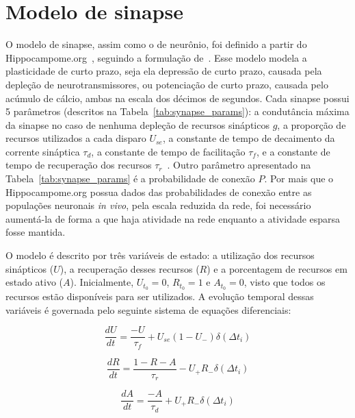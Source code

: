 

\section{Modelo de sinapse}

O modelo de sinapse, assim como o de neurônio, foi definido a partir do Hippocampome.org~\cite{wheelerHippocampomeorg2023},
seguindo a formulação de~\cite{mongilloSynaptic2008a}. Esse modelo modela a plasticidade de curto prazo,
seja ela depressão de curto prazo, causada pela depleção de neurotransmissores, ou potenciação de curto prazo, causada pelo
acúmulo de cálcio, ambas na escala dos décimos de segundos. Cada sinapse possui 5 parâmetros (descritos na
Tabela~\ref{tab:synapse_params}): a condutância máxima da sinapse no caso de nenhuma depleção de recursos sinápticos $g$, a
proporção de recursos utilizados a cada disparo $U_{se}$, a constante de tempo de decaimento da corrente sináptica $\tau_d$, a
constante de tempo de facilitação $\tau_f$, e a constante de tempo de recuperação dos recursos
$\tau_r$~\cite{moradiNormalized2022}. Outro parâmetro apresentado na Tabela~\ref{tab:synapse_params} é a probabilidade de conexão
$P$. Por mais que o Hippocampome.org possua dados das probabilidades de conexão entre as populações neuronais \textit{in vivo},
pela escala reduzida da rede, foi necessário aumentá-la de forma a que haja atividade na rede enquanto a atividade esparsa fosse
mantida.

O modelo é descrito por três variáveis de estado: a utilização dos recursos sinápticos ($U$), a recuperação desses recursos ($R$)
e a porcentagem de recursos em estado ativo ($A$). Inicialmente, $U_{t_0} = 0$, $R_{t_0} = 1$ e $A_{t_0} = 0$, 
visto que todos os recursos estão disponíveis para ser utilizados. A evolução temporal dessas
variáveis é governada pelo seguinte sistema de equações diferenciais:

\begin{equation}
    \label{eq_tsodyks_dU}
    \frac{dU}{dt} = \frac{-U}{\tau_f} + U_{se}(1-U_{-}) \delta(\Delta t_i)
\end{equation}

\begin{equation}
    \label{eq_tsodyks_dR}
    \frac{dR}{dt} = \frac{1-R-A}{\tau_r} - U_{+} R_{-} \delta(\Delta t_i)
\end{equation}

\begin{equation}
    \label{eq_tsodyks_dA}
    \frac{dA}{dt} = \frac{-A}{\tau_d} + U_{+} R_{-} \delta(\Delta t_i)
\end{equation}

